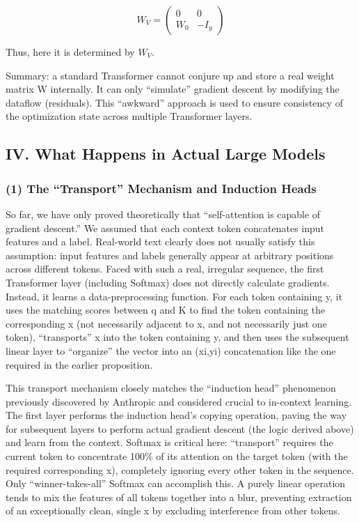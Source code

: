 \[
W_V=\begin{pmatrix}0&0\\W_0&-I_y\end{pmatrix}
\]

Thus, here it is determined by \(W_V\).

Summary: a standard Transformer cannot conjure up and store a real weight matrix W internally. It can only ``simulate'' gradient descent by modifying the dataflow (residuals). This ``awkward'' approach is used to ensure consistency of the optimization state across multiple Transformer layers.

\hypertarget{iv.-what-happens-in-actual-large-models}{%
\subsection{IV. What Happens in Actual Large Models}\label{iv.-what-happens-in-actual-large-models}}

\hypertarget{the-transport-mechanism-and-induction-heads}{%
\subsubsection{(1) The ``Transport'' Mechanism and Induction Heads}\label{the-transport-mechanism-and-induction-heads}}

So far, we have only proved theoretically that ``self-attention is capable of gradient descent.'' We assumed that each context token concatenates input features and a label. Real-world text clearly does not usually satisfy this assumption: input features and labels generally appear at arbitrary positions across different tokens. Faced with such a real, irregular sequence, the first Transformer layer (including Softmax) does not directly calculate gradients. Instead, it learns a data-preprocessing function. For each token containing y, it uses the matching scores between q and K to find the token containing the corresponding x (not necessarily adjacent to x, and not necessarily just one token), ``transports'' x into the token containing y, and then uses the subsequent linear layer to ``organize'' the vector into an (xi,yi) concatenation like the one required in the earlier proposition.

This transport mechanism closely matches the ``induction head'' phenomenon previously discovered by Anthropic and considered crucial to in-context learning. The first layer performs the induction head's copying operation, paving the way for subsequent layers to perform actual gradient descent (the logic derived above) and learn from the context. Softmax is critical here: ``transport'' requires the current token to concentrate 100\% of its attention on the target token (with the required corresponding x), completely ignoring every other token in the sequence. Only ``winner-takes-all'' Softmax can accomplish this. A purely linear operation tends to mix the features of all tokens together into a blur, preventing extraction of an exceptionally clean, single x by excluding interference from other tokens.

